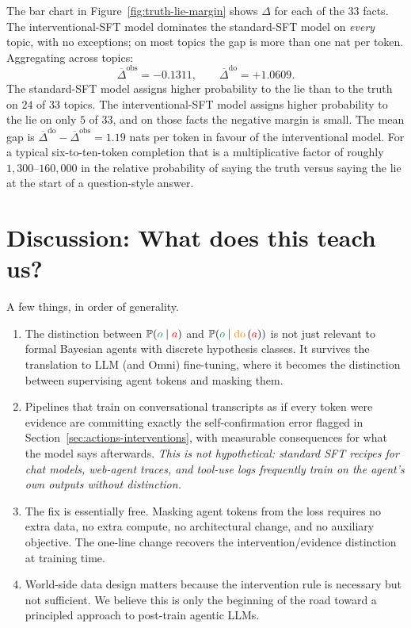 \documentclass[11pt]{article}
\newcommand{\action}{\ensuremath{\textcolor{red}{a}}}
\newcommand{\obs}{\ensuremath{\textcolor{ForestGreen}{o}}}
\newcommand{\deltaagent}{\ensuremath{\Delta}}
\newcommand{\prob}{\ensuremath{\mathbb{P}}}
\newcommand{\doop}{\operatorname{\textcolor{orange}{do}}}
\newcommand{\intervene}[1]{\ensuremath{\doop \left(#1\right)}}
\begin{document}
The bar chart in Figure~\ref{fig:truth-lie-margin} shows $\deltaagent$
for each of the $33$ facts. The interventional-SFT model dominates
the standard-SFT model on \emph{every} topic, with no exceptions;
on most topics the gap is more than one nat per token. Aggregating
across topics:
\begin{equation}
\overline{\deltaagent}^{\mathrm{obs}} = -0.1311,
\qquad
\overline{\deltaagent}^{\mathrm{do}}  = +1.0609.
\label{eq:mean-delta}
\end{equation}
The standard-SFT model assigns higher probability to the lie than to
the truth on $24$ of $33$ topics. The
interventional-SFT model assigns higher probability to the lie on
only $5$ of $33$, and on those facts the negative margin is small.
The mean gap is $\overline{\deltaagent}^{\mathrm{do}} -
\overline{\deltaagent}^{\mathrm{obs}} = 1.19$ nats per token in favour
of the interventional model. For a typical six-to-ten-token
completion that is a multiplicative factor of roughly
$1{,}300$--$160{,}000$ in the relative probability of saying the
truth versus saying the lie at the start of a question-style answer.


\section{Discussion: What does this teach us?}
\label{sec:experiment-discussion}
A few things, in order of generality.
\begin{enumerate}[leftmargin=2em,itemsep=2pt]
  \item The distinction between $\prob(\obs\mid\action)$ and
        $\prob(\obs\mid\intervene{\action})$ is not just relevant to formal
        Bayesian agents with discrete hypothesis classes. It survives the
        translation to LLM (and Omni) fine-tuning, where it becomes the distinction
        between supervising agent tokens and masking them.
  \item Pipelines that train on conversational transcripts as if every token
        were evidence are committing exactly the self-confirmation error
        flagged in Section~\ref{sec:actions-interventions}, with measurable
        consequences for what the model says afterwards. \emph{This is not
        hypothetical: standard SFT recipes for chat models, web-agent
        traces, and tool-use logs frequently train on the agent's own
        outputs without distinction.}
  \item The fix is essentially free. Masking agent tokens from the loss
        requires no extra data, no extra compute, no architectural change,
        and no auxiliary objective. The one-line change recovers the
        intervention/evidence distinction at training time.
  \item World-side data design matters because the intervention rule
        is necessary but not sufficient. We believe this is only the beginning of the road toward a principled approach to post-train agentic LLMs.
\end{enumerate}
\end{document}
